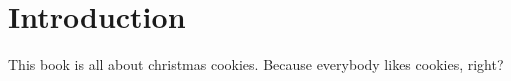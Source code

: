 \section{Introduction}
This book is all about christmas cookies. Because everybody likes cookies, right?
